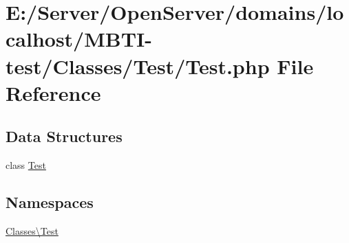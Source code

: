 \hypertarget{_classes_2_test_2_test_8php}{}\section{E\+:/\+Server/\+Open\+Server/domains/localhost/\+M\+B\+T\+I-\/test/\+Classes/\+Test/\+Test.php File Reference}
\label{_classes_2_test_2_test_8php}
\subsection*{Data Structures}
\begin{DoxyCompactItemize}
\item 
class \hyperlink{class_classes_1_1_test_1_1_test}{Test}
\end{DoxyCompactItemize}
\subsection*{Namespaces}
\begin{DoxyCompactItemize}
\item 
 \hyperlink{namespace_classes_1_1_test}{Classes\textbackslash{}\+Test}
\end{DoxyCompactItemize}
